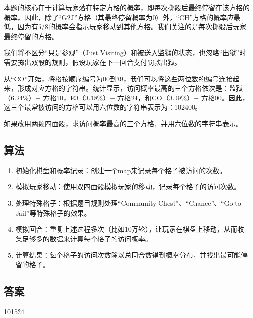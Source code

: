 \begin{tcolorbox}[breakable]
	本题的核心在于计算玩家落在特定方格的概率，即每次掷骰后最终停留在该方格的概率。因此，除了\enquote{G2J}方格（其最终停留概率为0）外，\enquote{CH}方格的概率应最低，因为有5/8的概率会指示玩家移动到其他方格。我们关注的是每次掷骰后玩家最终停留的方格。

	我们将不区分\enquote{只是参观}（Just Visiting）和被送入监狱的状态，也忽略\enquote{出狱}时需要掷出双骰的规则，假设玩家在下一回合支付罚款出狱。

	从\enquote{GO}开始，将格按顺序编号为00到39，我们可以将这些两位数的编号连接起来，形成对应方格的字符串。统计显示，访问概率最高的三个方格依次是：监狱（6.24\%）= 方格10，E3（3.18\%）= 方格24，和GO（3.09\%）= 方格00。因此，这三个最常被访问的方格可以用六位数的字符串表示为：102400。

	如果改用两颗四面骰，求访问概率最高的三个方格，并用六位数的字符串表示。

\end{tcolorbox}

\subsection{算法}
\begin{enumerate}
	\item	初始化棋盘和概率记录：创建一个map来记录每个格子被访问的次数。
	\item	模拟玩家移动：使用双四面骰模拟玩家的移动，记录每个格子的访问次数。
	\item	处理特殊格子：根据题目规则处理“Community Chest”、“Chance”、“Go to Jail”等特殊格子的效果。
	\item	模拟回合：重复上述过程多次（比如10万轮），让玩家在棋盘上移动，从而收集足够多的数据来计算每个格子的访问概率。
	\item	计算结果：每个格子的访问次数除以总回合数得到概率分布，并找出最可能停留的格子。
\end{enumerate}

\subsection{答案}
101524
